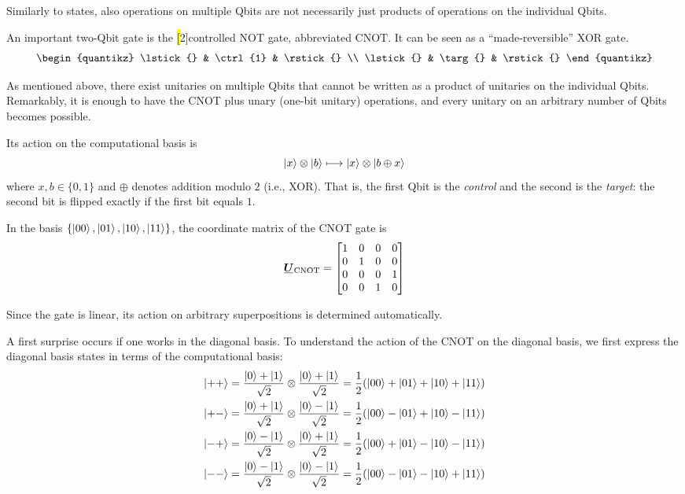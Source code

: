 Similarly to states, also operations on multiple Qbits are not necessarily just products of operations on the individual Qbits.


An important two-Qbit gate is the \hl[2]{controlled NOT} gate, abbreviated \(\mathrm{CNOT}\).
It can be seen as a ``made-reversible'' XOR gate.
\[
\begin{quantikz}
\lstick{} & \ctrl{1} & \rstick{} \\
\lstick{} & \targ{}  & \rstick{}
\end{quantikz}
\]

As mentioned above, there exist unitaries on multiple Qbits that cannot be written as a product of unitaries on the individual Qbits.
Remarkably, it is enough to have the CNOT plus unary (one-bit unitary) operations, and every unitary on an arbitrary number of Qbits becomes possible.

Its action on the computational basis is
\[
\ket{x} \otimes \ket{b}
\longmapsto
\ket{x}\otimes\ket{b\oplus x}
\]
where $x,b \in \{0,1\}$ and $\oplus$ denotes addition modulo $2$ (i.e., XOR).
That is, the first Qbit is the \emph{control} and the second is the \emph{target}:
the second bit is flipped exactly if the first bit equals \(1\).


In the basis
\(
\{\ket{00},\ket{01},\ket{10},\ket{11}\}
\),
the coordinate matrix of the CNOT gate is
\[
\matr{U}_{\mathrm{CNOT}}
=
\begin{bmatrix}
1&0&0&0\\
0&1&0&0\\
0&0&0&1\\
0&0&1&0
\end{bmatrix}
\]

Since the gate is linear, its action on arbitrary superpositions is determined automatically.

A first surprise occurs if one works in the diagonal basis.
To understand the action of the CNOT on the diagonal basis, we first express the diagonal basis states in terms of the computational basis:
\[
\begin{aligned}
\ket{++} &= \frac{\ket{0}+\ket{1}}{\sqrt{2}} \otimes \frac{\ket{0}+\ket{1}}{\sqrt{2}} = \frac{1}{2}(\ket{00}+\ket{01}+\ket{10}+\ket{11}) \\
\ket{+-} &= \frac{\ket{0}+\ket{1}}{\sqrt{2}} \otimes \frac{\ket{0}-\ket{1}}{\sqrt{2}} = \frac{1}{2}(\ket{00}-\ket{01}+\ket{10}-\ket{11}) \\
\ket{-+} &= \frac{\ket{0}-\ket{1}}{\sqrt{2}} \otimes \frac{\ket{0}+\ket{1}}{\sqrt{2}} = \frac{1}{2}(\ket{00}+\ket{01}-\ket{10}-\ket{11}) \\
\ket{--} &= \frac{\ket{0}-\ket{1}}{\sqrt{2}} \otimes \frac{\ket{0}-\ket{1}}{\sqrt{2}} = \frac{1}{2}(\ket{00}-\ket{01}-\ket{10}+\ket{11})
\end{aligned}
\]


